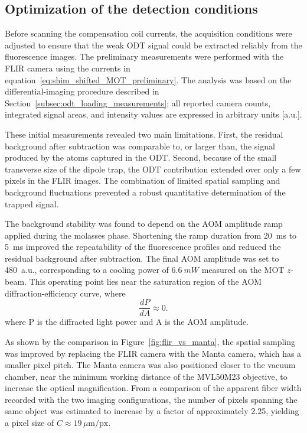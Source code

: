 \subsection{Optimization of the detection conditions}
\label{subsec:odt_detection_optimization}

Before scanning the compensation coil currents, the acquisition conditions were adjusted to ensure that the weak ODT signal could be extracted reliably from the fluorescence images. The preliminary measurements were performed with the FLIR camera using the currents in equation~\eqref{eq:shim_shifted_MOT_preliminary}. The analysis was based on the differential-imaging procedure described in Section~\ref{subsec:odt_loading_measurements}; all reported camera counts, integrated signal areas, and intensity values are expressed in arbitrary units [a.u.].

These initial measurements revealed two main limitations. First, the residual background after subtraction was comparable to, or larger than, the signal produced by the atoms captured in the ODT. Second, because of the small transverse size of the dipole trap, the ODT contribution extended over only a few pixels in the FLIR images. The combination of limited spatial sampling and background fluctuations prevented a robust quantitative determination of the trapped signal.

The background stability was found to depend on the AOM amplitude ramp applied during the molasses phase. Shortening the ramp duration from 20~ms to 5~ms improved the repeatability of the fluorescence profiles and reduced the residual background after subtraction. The final AOM amplitude was set to 480~a.u., corresponding to a cooling power of $6.6~mW$ measured on the MOT $z$-beam. This operating point lies near the saturation region of the AOM diffraction-efficiency curve, where
\begin{equation}
    \frac{dP}{dA}\approx0.
\end{equation}
where P is the diffracted light power and A is the AOM amplitude.

As shown by the comparison in Figure~\ref{fig:flir_vs_manta}, the spatial sampling was improved by replacing the FLIR camera with the Manta camera, which has a smaller pixel pitch. The Manta camera was also positioned closer to the vacuum chamber, near the minimum working distance of the MVL50M23 objective, to increase the optical magnification. From a comparison of the apparent fiber width recorded with the two imaging configurations, the number of pixels spanning the same object was estimated to increase by a factor of approximately 2.25, yielding a pixel size of $C \approx 19 \,\mu\mathrm{m/px}$.

